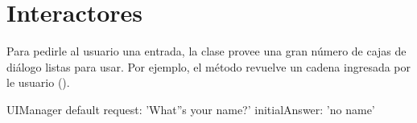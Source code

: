 \documentclass[a4paper,10pt,twoside]{book}
\begin{document}

\section{Interactores}

Para pedirle al usuario una entrada, la clase  provee una gran n\'umero de  cajas de di\'alogo listas para usar.
Por ejemplo, el m\'etodo  revuelve un cadena ingresada por le usuario ().

\begin{code}{}
UIManager default request: 'What''s your name?' initialAnswer: 'no name'
\end{code}
\end{document}
